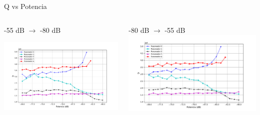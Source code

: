 \documentclass[ignorenonframetext,12pt]{beamer}
\begin{document}
\begin{frame}{Q vs Potencia}
				\begin{columns}
								\begin{column}{0.49\textwidth}
												-55 dB $\to$ -80 dB

												\centering
												\includegraphics[height=0.65\textheight,width=1.1\textwidth]{Q_vs_P_tot_des}
								\end{column}
								\begin{column}{0.49\textwidth}
												-80 dB $\to$ -55 dB
												\centering
												\includegraphics[height=0.65\textheight,width=1.1\textwidth]{Q_vs_P_tot_asc}
								\end{column}
				\end{columns}

\end{frame}
\end{document}
